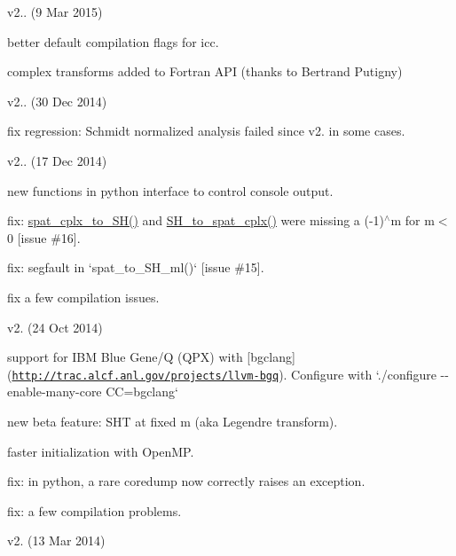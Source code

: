 \begin{DoxyItemize}
\item v2.. (9 Mar 2015)
\begin{DoxyItemize}
\item better default compilation flags for icc.
\item complex transforms added to Fortran A\+P\+I (thanks to Bertrand Putigny)
\end{DoxyItemize}
\item v2.. (30 Dec 2014)
\begin{DoxyItemize}
\item fix regression\+: Schmidt normalized analysis failed since v2. in some cases.
\end{DoxyItemize}
\item v2.. (17 Dec 2014)
\begin{DoxyItemize}
\item new functions in python interface to control console output.
\item fix\+: {\ttfamily \hyperlink{group__sht_gacfe564c5f554c04834c2fd02a2cbd660}{spat\+\_\+cplx\+\_\+to\+\_\+\+S\+H()}} and {\ttfamily \hyperlink{group__sht_gace24abc96ffd0cf8dd5bc282854fa91f}{S\+H\+\_\+to\+\_\+spat\+\_\+cplx()}} were missing a (-\/1)$^\wedge$m for m$<$0 \mbox{[}issue \#16\mbox{]}.
\item fix\+: segfault in `spat\+\_\+to\+\_\+\+S\+H\+\_\+ml()` \mbox{[}issue \#15\mbox{]}.
\item fix a few compilation issues.
\end{DoxyItemize}
\item v2. (24 Oct 2014)
\begin{DoxyItemize}
\item support for I\+B\+M Blue Gene/\+Q (Q\+P\+X) with \mbox{[}bgclang\mbox{]}(\href{http://trac.alcf.anl.gov/projects/llvm-bgq}{\tt http\+://trac.\+alcf.\+anl.\+gov/projects/llvm-\/bgq}). Configure with `./configure -\/-\/enable-\/many-\/core C\+C=bgclang`
\item new beta feature\+: S\+H\+T at fixed m (aka Legendre transform).
\item faster initialization with Open\+M\+P.
\item fix\+: in python, a rare coredump now correctly raises an exception.
\item fix\+: a few compilation problems.
\end{DoxyItemize}
\item v2. (13 Mar 2014)
\begin{DoxyItemize}

\end{DoxyItemize}
\end{DoxyItemize}
